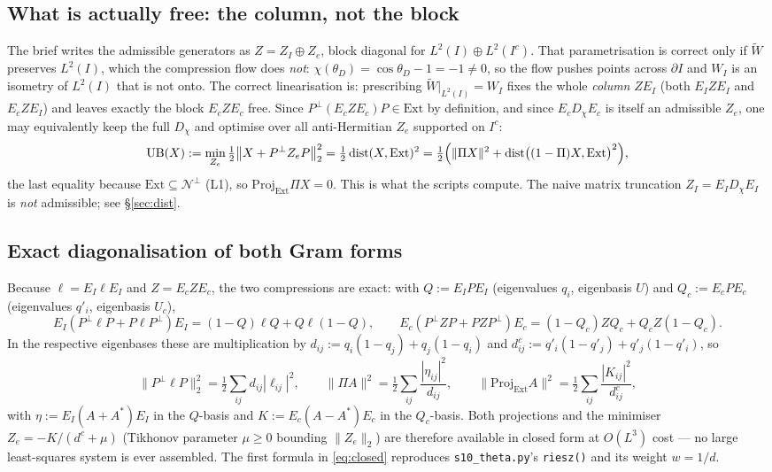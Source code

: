 \documentclass[11pt]{article}
\begin{document}
\subsection{What is actually free: the column, not the block}\label{ssec:column}
The brief writes the admissible generators as $Z=Z_I\oplus Z_e$, block diagonal for
$L^2(I)\oplus L^2(I^c)$.  That parametrisation is correct only if $\widetilde W$
preserves $L^2(I)$, which the compression flow does \emph{not}: $\chi(\theta_D)=\cos\theta_D-1=-1\neq0$,
so the flow pushes points across $\partial I$ and $W_I$ is an isometry of $L^2(I)$ that is
not onto.  The correct linearisation is: prescribing $\widetilde W|_{L^2(I)}=W_I$ fixes the
whole \emph{column} $ZE_I$ (both $E_IZE_I$ and $E_cZE_I$) and leaves exactly the block
$E_cZE_c$ free.  Since $P^\perp(E_cZE_c)P\in\mathrm{Ext}$ by definition, and since
$E_cD_\chi E_c$ is itself an admissible $Z_e$, one may equivalently keep the full $D_\chi$
and optimise over all anti-Hermitian $Z_e$ supported on $I^c$:
\begin{equation}\label{eq:UB}
 \mathrm{UB}(X):=\min_{Z_e}\tfrac12\bigl\|X+P^\perp Z_eP\bigr\|_2^2
 =\tfrac12\operatorname{dist}(X,\mathrm{Ext})^2
 =\tfrac12\Bigl(\|\Pi X\|^2+\operatorname{dist}\bigl((1-\Pi)X,\mathrm{Ext}\bigr)^2\Bigr),
\end{equation}
the last equality because $\mathrm{Ext}\subseteq\mathcal N^\perp$ (L1), so
$\mathrm{Proj}_{\mathrm{Ext}}\Pi X=0$.  This is what the scripts compute.  The naive matrix
truncation $Z_I=E_ID_\chi E_I$ is \emph{not} admissible; see \S\ref{sec:dist}.

\subsection{Exact diagonalisation of both Gram forms}
Because $\ell=E_I\ell E_I$ and $Z=E_cZE_c$, the two compressions are exact:
with $Q:=E_IPE_I$ (eigenvalues $q_i$, eigenbasis $U$) and $Q_c:=E_cPE_c$
(eigenvalues $q'_i$, eigenbasis $U_c$),
\begin{equation}\label{eq:gram}
 E_I(P^\perp\ell P+P\ell P^\perp)E_I=(1-Q)\ell Q+Q\ell(1-Q),\qquad
 E_c(P^\perp ZP+PZP^\perp)E_c=(1-Q_c)ZQ_c+Q_cZ(1-Q_c).
\end{equation}
In the respective eigenbases these are multiplication by
$d_{ij}:=q_i(1-q_j)+q_j(1-q_i)$ and $d^c_{ij}:=q'_i(1-q'_j)+q'_j(1-q'_i)$, so
\begin{equation}\label{eq:closed}
 \|P^\perp\ell P\|_2^2=\tfrac12\sum_{ij}d_{ij}|\ell_{ij}|^2,\qquad
 \|\Pi A\|^2=\tfrac12\sum_{ij}\frac{|\eta_{ij}|^2}{d_{ij}},\qquad
 \|\mathrm{Proj}_{\mathrm{Ext}}A\|^2=\tfrac12\sum_{ij}\frac{|K_{ij}|^2}{d^c_{ij}},
\end{equation}
with $\eta:=E_I(A+A^*)E_I$ in the $Q$-basis and $K:=E_c(A-A^*)E_c$ in the $Q_c$-basis.
Both projections and the minimiser $Z_e=-K/(d^c+\mu)$ (Tikhonov parameter $\mu\ge0$
bounding $\|Z_e\|_2$) are therefore available in closed form at $O(L^3)$ cost --- no
large least-squares system is ever assembled.  The first formula in \eqref{eq:closed}
reproduces \texttt{s10\_theta.py}'s \texttt{riesz()} and its weight $w=1/d$.
\end{document}

